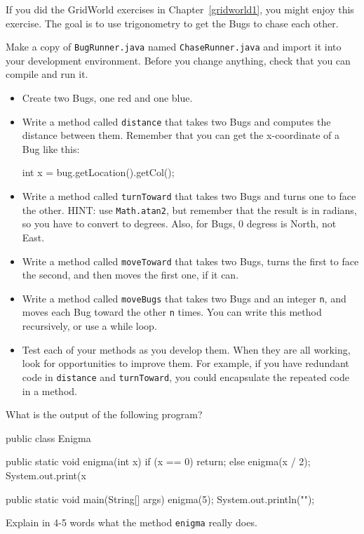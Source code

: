 \begin{exercise}
If you did the GridWorld exercises in Chapter~\ref{gridworld1}, you
might enjoy this exercise.  The goal is to use trigonometry to get the
Bugs to chase each other.

Make a copy of {\tt BugRunner.java} named {\tt ChaseRunner.java} and
import it into your development environment.  Before you change
anything, check that you can compile and run it.

\begin{itemize}

\item Create two Bugs, one red and one blue.

\item Write a method called {\tt distance} that takes two Bugs
and computes the distance between them.  Remember that you can
get the x-coordinate of a Bug like this:

\begin{code}
    int x = bug.getLocation().getCol();
\end{code}

\item Write a method called {\tt turnToward} that takes two
Bugs and turns one to face the other.  HINT: use {\tt Math.atan2},
but remember that the result is in radians, so you have to
convert to degrees.  Also, for Bugs, 0 degress is North, not East.

\item Write a method called {\tt moveToward} that takes two
Bugs, turns the first to face the second, and then moves the
first one, if it can.

\item Write a method called {\tt moveBugs} that takes two Bugs
and an integer {\tt n}, and moves each Bug toward the other {\tt n}
times.  You can write this method recursively, or use a while loop.

\item Test each of your methods as you develop them.  When they are
  all working, look for opportunities to improve them.  For example,
  if you have redundant code in {\tt distance} and {\tt turnToward},
  you could encapsulate the repeated code in a method.

\end{itemize}
\end{exercise}


\begin{exercise}
What is the output of the following program?

\begin{code}
public class Enigma {

    public static void enigma(int x) {
        if (x == 0) {
            return;
        } else {
            enigma(x / 2);
        }
        System.out.print(x %
    }

    public static void main(String[] args) {
        enigma(5);
        System.out.println("");
    }
}
\end{code}

Explain in 4-5 words what the method {\tt enigma} really does.
\end{exercise}


